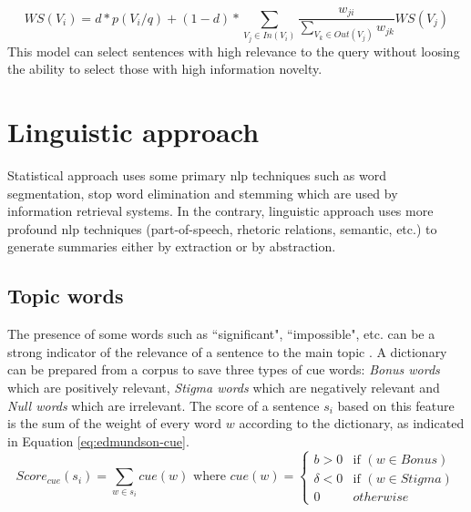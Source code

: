 \begin{equation}
	\label{eq:pprsum}
	WS(V_i) = d * p(V_i/q) + (1-d) * \sum\limits_{V_j \in In(V_i)} \frac{w_{ji}}{\sum\limits_{V_k \in Out(V_j)} w_{jk}} WS(V_j)
\end{equation}
This model can select sentences with high relevance to the query without loosing the ability to select those with high information novelty. 


\section{Linguistic approach}

Statistical approach uses some primary \ac{nlp} techniques such as word segmentation, stop word elimination and stemming which are used by information retrieval systems. 
In the contrary, linguistic approach uses more profound \ac{nlp} techniques (part-of-speech, rhetoric relations, semantic, etc.) to generate summaries either by extraction or by abstraction. 

\subsection{Topic words}

The presence of some words such as ``significant", ``impossible", etc. can be a strong indicator of the relevance of a sentence to the main topic \citep{69-edmundson}.
A dictionary can be prepared from a corpus to save three types of cue words: \textit{Bonus words} which are positively relevant, \textit{Stigma words} which are negatively relevant and \textit{Null words} which are irrelevant.
The score of a sentence  $ s_i $ based on this feature is the sum of the weight of every word $ w $ according to the dictionary, as indicated in Equation \ref{eq:edmundson-cue}.
\begin{equation}
	\label{eq:edmundson-cue}
	Score_{cue}(s_i) = \sum_{w \in s_i}{cue(w)}
	\text{ where }
	cue(w) = \left\lbrace 
	\begin{array}{ll}
		b > 0 & \text{if } (w \in Bonus) \\
		\delta < 0 & \text{if } (w \in Stigma) \\
		0 & otherwise 
	\end{array} 
	\right. 
\end{equation}

